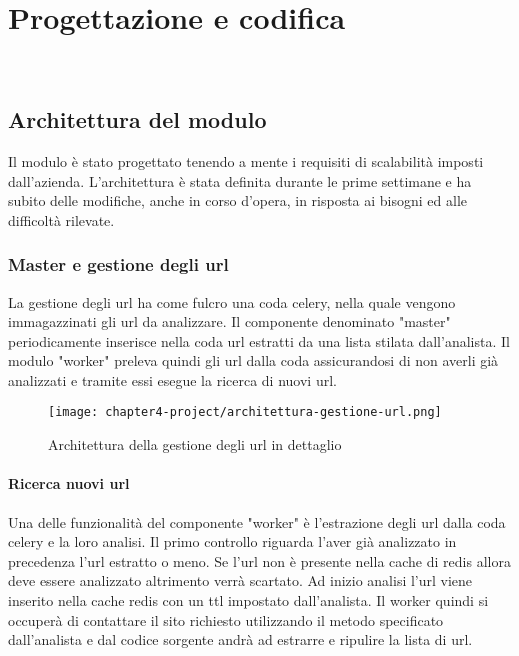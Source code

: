 
\chapter{Progettazione e codifica}
\label{cap:progettazione-codifica}

\\

\section{Architettura del modulo}

Il modulo è stato progettato tenendo a mente i requisiti di scalabilità imposti dall'azienda. L'architettura è stata definita durante le prime settimane e ha subito delle modifiche, anche in corso d'opera, in risposta ai bisogni ed alle difficoltà rilevate.

\subsection{Master e gestione degli url}

La gestione degli url ha come fulcro una coda celery, nella quale vengono immagazzinati gli url da analizzare. Il componente denominato "master" periodicamente inserisce nella coda url estratti da una lista stilata dall'analista. Il modulo "worker" preleva quindi gli url dalla coda assicurandosi di non averli già analizzati e tramite essi esegue la ricerca di nuovi url. 


\begin{figure}[!h] 
    \centering 
    \texttt{[image: chapter4-project/architettura-gestione-url.png]} 
    \caption{Architettura della gestione degli url in dettaglio}
\end{figure}
\newpage{}

\subsubsection{Ricerca nuovi url}
Una delle funzionalità del componente "worker" è l'estrazione degli url dalla coda celery e la loro analisi. Il primo controllo riguarda l'aver già analizzato in precedenza l'url estratto o meno. Se l'url non è presente nella cache di redis allora deve essere analizzato altrimento verrà scartato. Ad inizio analisi l'url viene inserito nella cache redis con un \gls{ttl} impostato dall'analista. Il worker quindi si occuperà di contattare il sito richiesto utilizzando il metodo specificato dall'analista e dal codice sorgente andrà ad estrarre e ripulire la lista di url. 


